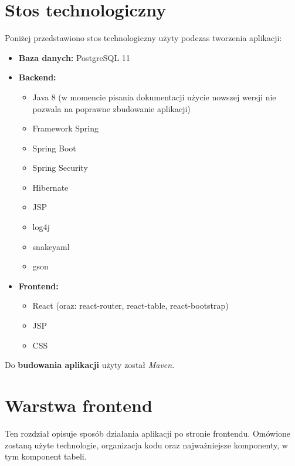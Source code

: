 \documentclass[11pt]{article}
\begin{document}
\section{Stos technologiczny}
Poniżej przedstawiono stos technologiczny użyty podczas tworzenia aplikacji:
\begin{itemize}
\item \textbf{Baza danych:} PostgreSQL 11
\item \textbf{Backend:}
\begin{itemize}
\item Java 8 (w momencie pisania dokumentacji użycie nowszej wersji nie pozwala na poprawne zbudowanie aplikacji)
\item Framework Spring
\item Spring Boot
\item Spring Security
\item Hibernate
\item JSP
\item log4j
\item snakeyaml
\item gson
\end{itemize}
\item \textbf{Frontend:}
\begin{itemize}
\item React (oraz: react-router, react-table, react-bootstrap)
\item JSP
\item CSS
\end{itemize}
\end{itemize}
Do \textbf{budowania aplikacji} użyty został \emph{Maven}.



\newpage
\section{Warstwa frontend}
Ten rozdział opisuje sposób działania aplikacji po stronie frontendu. Omówione zostaną użyte technologie, organizacja kodu oraz najważniejsze komponenty, w tym komponent tabeli.
\end{document}
